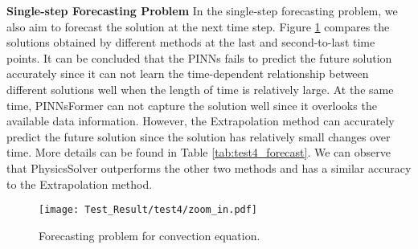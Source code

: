 \documentclass[preprint,11pt]{elsarticle}
\begin{document}
\textbf{Single-step Forecasting Problem }
In the single-step forecasting problem, we also aim to forecast the solution at the next time step. Figure \ref{fig:test4_forecast} compares the solutions obtained by different methods at the last and second-to-last time points.
It can be concluded that the PINNs fails to predict the future solution accurately since it can not learn the time-dependent relationship between different solutions well when the length of time is relatively large. At the same time, PINNsFormer can not capture the solution well since it overlooks the available data information. However, the Extrapolation method can accurately predict the future solution since the solution has relatively small changes over time. More details can be found in Table \ref{tab:test4_forecast}. We can observe that PhysicsSolver outperforms the other two methods and has a similar accuracy to the Extrapolation method. 
\begin{figure}[h]
\centering
\hspace*{-0.9cm}
\texttt{[image: Test\_Result/test4/zoom\_in.pdf]}
    \caption{Forecasting problem for convection equation.}
    \label{fig:test4_forecast}
\end{figure}

\begin{table}[H]
\vspace{-15pt}
    
	\vskip 0.1in
	\centering
	\begin{small}
		\begin{sc}
			\renewcommand{\multirowsetup}{\centering}
			\setlength{\tabcolsep}{5.5pt}
		\end{sc}
	\end{small}
    \caption{Relative $l^2$ errors.}
	\label{tab:test4_forecast}
\end{table}




\end{document}
